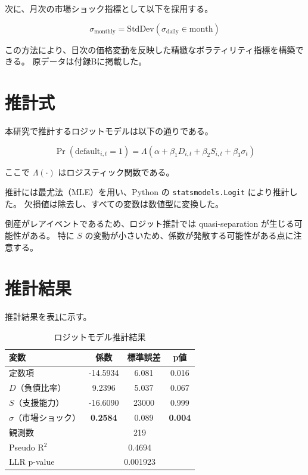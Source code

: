 次に、月次の市場ショック指標として以下を採用する。



\[
\sigma_{\mathrm{monthly}}
=
\mathrm{StdDev}\left(\sigma_{\mathrm{daily}} \in \text{month}\right)
\]



この方法により、日次の価格変動を反映した精緻なボラティリティ指標を構築できる。
原データは付録Bに掲載した。

\section{推計式}
\label{sec:method}

本研究で推計するロジットモデルは以下の通りである。



\[
\Pr(\text{default}_{i,t}=1)
=
\Lambda\left(
\alpha
+ \beta_1 D_{i,t}
+ \beta_2 S_{i,t}
+ \beta_3 \sigma_t
\right)
\]



ここで $\Lambda(\cdot)$ はロジスティック関数である。

推計には最尤法（MLE）を用い、Python の
\texttt{statsmodels.Logit} により推計した。
欠損値は除去し、すべての変数は数値型に変換した。

倒産がレアイベントであるため、ロジット推計では
quasi-separation が生じる可能性がある。
特に $S$ の変動が小さいため、係数が発散する可能性がある点に注意する。

\section{推計結果}
\label{sec:results}

推計結果を表\ref{tab:logit_result}に示す。

\begin{table}[H]
\centering
\caption{ロジットモデル推計結果}
\label{tab:logit_result}
\begin{tabular}{lccc}
\toprule
変数 & 係数 & 標準誤差 & p値 \\
\midrule
定数項 & -14.5934 & 6.081 & 0.016 \\
$D$（負債比率） & 9.2396 & 5.037 & 0.067 \\
$S$（支援能力） & -16.6090 & 23000 & 0.999 \\
$\sigma$（市場ショック） & \textbf{0.2584} & 0.089 & \textbf{0.004} \\
\midrule
観測数 & \multicolumn{3}{c}{219} \\
Pseudo R$^2$ & \multicolumn{3}{c}{0.4694} \\
LLR p-value & \multicolumn{3}{c}{0.001923} \\
\bottomrule
\end{tabular}
\end{table}

